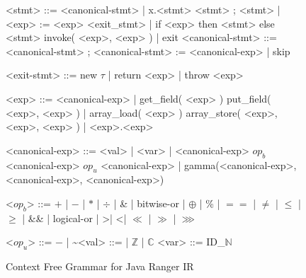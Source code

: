 %
\begin{figure}
\begin{grammar}
<stmt> ::= <canonical-stmt> | x.<stmt> 
\alt <stmt> ; <stmt> | <exp> := <exp>
\alt <exit_stmt> | if <exp> then <stmt> else <stmt> 
\alt invoke( <exp>, <exp> )  | exit
<canonical-stmt> ::= <canonical-stmt> ; <canonical-stmt> 
 := <canonical-exp> | skip

<exit-stmt> ::=  new $\tau$  | return <exp> |  throw <exp> 

<exp>  ::=  <canonical-exp> | get_field( <exp> ) 
\alt put_field( <exp>, <exp> ) | array_load( <exp> ) 
\alt array_store( <exp>, <exp>, <exp> ) | <exp>.<exp>

<canonical-exp> ::= <val> | <var> | <canonical-exp> $op_b$ <canonical-exp> 
\alt $op_u$ <canonical-exp> | gamma(<canonical-exp>, <canonical-exp>, <canonical-exp>)

<$op_b$> ::= $+$ | $-$ | $*$ | $\div$ | \& | bitwise-or | $\oplus$ | \% | $==$ | $\neq$ | $\leq$ | $\geq$ | \&\& | logical-or | \textgreater | \textless | $\ll$ | $\gg$ | $\ggg$

<$op_u$> ::= $-$ | \textasciitilde  \quad <val> ::= \unit | $\mathbb{Z}$ |  $\mathbb{C}$ \quad <var> ::= ID_$\mathbb{N}$
\end{grammar}
\caption{Context Free Grammar for Java Ranger IR}
\label{fig:grammar}
\end{figure}


